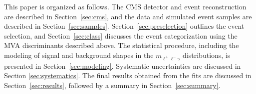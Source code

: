 This paper is organized as follows. The CMS detector and event reconstruction are described in Section~\ref{sec:cms}, and the data and simulated event samples are described in Section~\ref{sec:samples}. Section~\ref{sec:preselection} outlines the event selection, and Section~\ref{sec:class} discusses the event categorization using the MVA discriminants described above. The statistical procedure, including the modeling of signal and background shapes in the $m_{\ell^+\ell^-\gamma}$ distributions, is presented in Section~\ref{sec:modeling}. Systematic uncertainties are discussed in Section \ref{sec:systematics}. The final results obtained from the fits are discussed in Section~\ref{sec:results}, followed by a summary in Section~\ref{sec:summary}.
